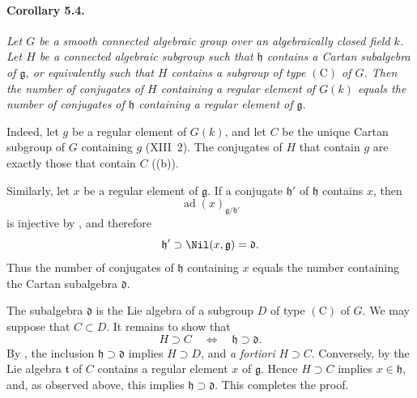 \paragraph{\textbf{Corollary 5.4.}}
{\itshape Let \(G\) be a smooth connected algebraic group over an
algebraically closed field \(k\). Let \(H\) be a connected
algebraic subgroup such that \(\mathfrak h\) contains a Cartan
subalgebra of \(\mathfrak g\), or equivalently such that \(H\)
contains a subgroup of type \((\mathrm C)\) of \(G\). Then the
number of conjugates of \(H\) containing a regular element of
\(G(k)\) equals the number of conjugates of \(\mathfrak h\)
containing a regular element of \(\mathfrak g\).}

Indeed, let \(g\) be a regular element of \(G(k)\), and let \(C\)
be the unique Cartan subgroup of \(G\) containing \(g\)
\textup{(XIII~2)}. The conjugates of \(H\) that contain \(g\) are
exactly those that contain \(C\)
\textup{(\textup{(b)})}.

Similarly, let \(x\) be a regular element of \(\mathfrak g\). If a
conjugate \(\mathfrak h'\) of \(\mathfrak h\) contains \(x\), then
\[
  \operatorname{ad}(x)_{\mathfrak g/\mathfrak h'}
\]
is injective by , and therefore
\[
  \mathfrak h'\supset\Nil(x,\mathfrak g)=\mathfrak d.
\]
Thus the number of conjugates of \(\mathfrak h\) containing \(x\)
equals the number containing the Cartan subalgebra
\(\mathfrak d\).

The subalgebra \(\mathfrak d\) is the Lie algebra of a subgroup
\(D\) of type \((\mathrm C)\) of \(G\). We may suppose that
\(C\subset D\). It remains to show that
\[
  H\supset C\quad\Longleftrightarrow\quad
  \mathfrak h\supset\mathfrak d.
\]
By , the inclusion
\(\mathfrak h\supset\mathfrak d\) implies \(H\supset D\), and
\emph{a fortiori} \(H\supset C\). Conversely, by  the Lie
algebra \(\mathfrak t\) of \(C\) contains a regular element \(x\)
of \(\mathfrak g\). Hence \(H\supset C\) implies
\(x\in\mathfrak h\), and, as observed above, this implies
\(\mathfrak h\supset\mathfrak d\). This completes the proof.

